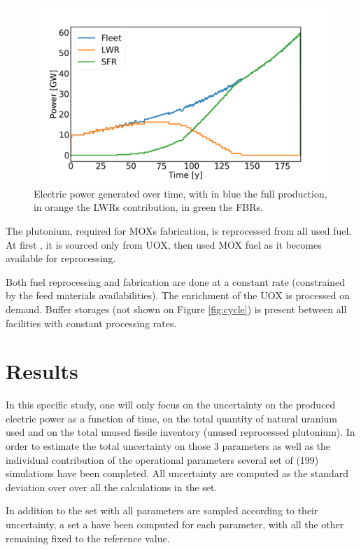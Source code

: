 \documentclass{anstrans}
\begin{document}
\begin{figure}[ht] %
    \centering
    \includegraphics[scale=0.18]{power.png}
    \caption{Electric power generated over time, with in blue the full production,
        in orange the \glspl{LWR} contribution, in green the \glspl{FBR}.}
    \label{fig:power}
\end{figure}


The plutonium, required for \glspl{MOX} fabrication, is reprocessed from all
used fuel.  At first , it is sourced only from UOX, then used MOX fuel as it becomes
available for reprocessing.

Both fuel reprocessing and fabrication are done at a constant rate (constrained
by the feed materials availabilities).  The enrichment of the UOX is processed on
demand.  Buffer storages (not shown on Figure \ref{fig:cycle}) is present between
all facilities with constant processing rates.


\section{Results}
In this specific study, one will only focus on the uncertainty on the produced
electric power as a function of time, on the total quantity of natural uranium
used and on the total unused fissile inventory (unused reprocessed plutonium).
In order to estimate the total uncertainty on those 3 parameters as well as the
individual contribution of the operational parameters several set of (199)
simulations have been completed.  All uncertainty are computed as the standard
deviation over over all the calculations in the set.

In addition to the set with all parameters are sampled according to their
uncertainty, a set a have been computed for each parameter, with all the other
remaining fixed to the reference value.
\end{document}
